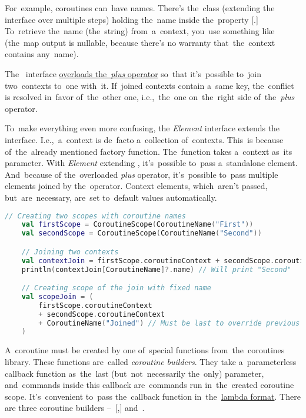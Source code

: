 For~example, coroutines can~have names.
There's the~class  (extending the~ interface over multiple steps) holding the~name inside the~property [.]
To~retrieve the~name (the~string) from~a~context, you~use something like  (the~map output is nullable, because there's no warranty that~the~context contains any~name).

The~ interface \hyperref[kotlinoperatoroverload]{overloads the~\textit{plus} operator} so~that it's~possible to~join two~contexts to~one with~it.
If~joined contexts contain a~same key, the~conflict is resolved in~favor of~the~other one, i.e.,~the~one on~the~right side of~the~\textit{plus} operator.

To~make everything even more confusing, the \textit{Element} interface extends the~ interface.
I.e.,~a~context is de~facto a~collection of~contexts.
This~is because of~the~already mentioned \hyperref[kotlincoroutinescope]{} factory function.
The~function takes a~context as~its parameter.
With \textit{Element} extending , it's~possible to~pass a~standalone element.
And~because of the~overloaded \textit{plus} operator, it's~possible to~pass multiple elements joined by the~operator.
Context elements, which~aren't passed, but~are~necessary, are~set to~default values automatically.

\begin{lstlisting}[language=Kotlin]
    // Creating two scopes with coroutine names
    val firstScope = CoroutineScope(CoroutineName("First"))
    val secondScope = CoroutineScope(CoroutineName("Second"))

    // Joining two contexts
    val contextJoin = firstScope.coroutineContext + secondScope.coroutineContext
    println(contextJoin[CoroutineName]?.name) // Will print "Second"

    // Creating scope of the join with fixed name
    val scopeJoin = (
        firstScope.coroutineContext
        + secondScope.coroutineContext
        + CoroutineName("Joined") // Must be last to override previous
    )
\end{lstlisting}

\label{kotlincoroutinebuilder}
A~coroutine must be created by one of~special functions from~the~coroutines library.
These functions are~called \textit{coroutine builders}.
They take a~parameterless callback function as~the~last (but~not~necessarily the~only) parameter, and~commands inside this callback are~commands run in~the~created coroutine scope.
It's~convenient to~pass the~callback function in~the~\hyperref[kotlinlambda]{lambda format}.
There are three coroutine builders --~[,]  and~.

